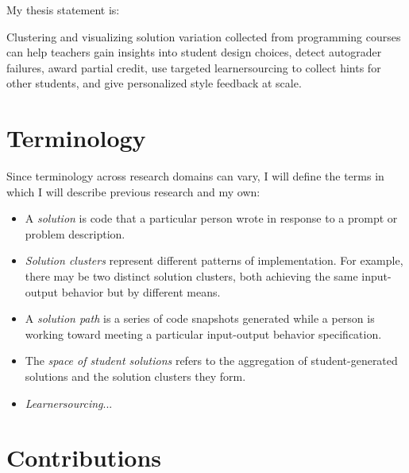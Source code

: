 My thesis statement is: 
\begin{displayquote}
Clustering and visualizing solution variation collected from programming courses can help teachers gain insights into student design choices, detect autograder failures, award partial credit, use targeted learnersourcing to collect hints for other students, and give personalized style feedback at scale.
\end{displayquote}

\section{Terminology}


Since terminology across research domains can vary, I will define the terms in which I will describe previous research and my own: 
\begin{itemize}
\item A {\it solution} is code that a particular person wrote in response to a prompt or problem description.
\item {\it Solution clusters} represent different patterns of implementation. For example, there may be two distinct solution clusters, both achieving the same input-output behavior but by different means. 
\item A {\it solution path} is a series of code snapshots generated while a person is working toward meeting a particular input-output behavior specification. 
\item The {\it space of student solutions} refers to the aggregation of student-generated solutions and the solution clusters they form.
\item {\it Learnersourcing}... 
\end{itemize}

\section{Contributions}

